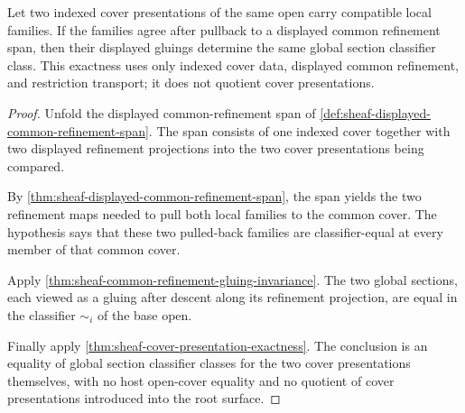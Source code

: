 \begin{theorem}
\label{thm:sheaf-root-common-refinement-exactness-obligation}
Let two indexed cover presentations of the same open carry compatible local families. If the families agree after pullback to a displayed common refinement span, then their displayed gluings determine the same global section classifier class. This exactness uses only indexed cover data, displayed common refinement, and restriction transport; it does not quotient cover presentations.
\end{theorem}
\begin{proof}
Unfold the displayed common-refinement span of \autoref{def:sheaf-displayed-common-refinement-span}. The span consists of one indexed cover together with two displayed refinement projections into the two cover presentations being compared.

By \autoref{thm:sheaf-displayed-common-refinement-span}, the span yields the two refinement maps needed to pull both local families to the common cover. The hypothesis says that these two pulled-back families are classifier-equal at every member of that common cover.

Apply \autoref{thm:sheaf-common-refinement-gluing-invariance}. The two global sections, each viewed as a gluing after descent along its refinement projection, are equal in the classifier $\sim_i$ of the base open.

Finally apply \autoref{thm:sheaf-cover-presentation-exactness}. The conclusion is an equality of global section classifier classes for the two cover presentations themselves, with no host open-cover equality and no quotient of cover presentations introduced into the root surface.
\end{proof}
